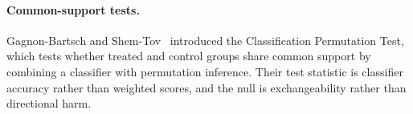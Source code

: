\paragraph{Common-support tests.}
Gagnon-Bartsch and Shem-Tov~\cite{GagnonBartsch_2019} introduced the Classification Permutation Test, which tests whether treated and control groups share common support by combining a classifier with permutation inference. Their test statistic is classifier accuracy rather than weighted scores, and the null is exchangeability rather than directional harm.
